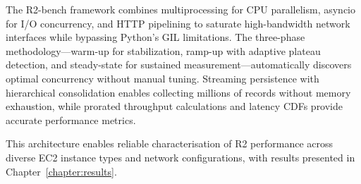 The R2-bench framework combines multiprocessing for CPU parallelism, asyncio for I/O concurrency, and HTTP pipelining to saturate high-bandwidth network interfaces while bypassing Python's GIL limitations. The three-phase methodology—warm-up for stabilization, ramp-up with adaptive plateau detection, and steady-state for sustained measurement—automatically discovers optimal concurrency without manual tuning. Streaming persistence with hierarchical consolidation enables collecting millions of records without memory exhaustion, while prorated throughput calculations and latency CDFs provide accurate performance metrics.

This architecture enables reliable characterisation of R2 performance across diverse EC2 instance types and network configurations, with results presented in Chapter~\ref{chapter:results}.
